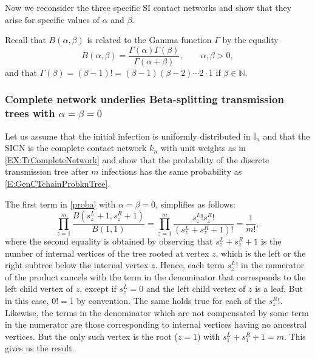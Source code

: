 \documentclass[review]{elsarticle}
\numberwithin{equation}{section}
\let\orgautoref\autoref
\renewcommand{\autoref}
        {\def\equationautorefname{Eq.}%
         \def\figureautorefname{Fig.}%
         \def\subfigureautorefname{Fig.}%
         \def\sectionautorefname{Sect.}%
         \def\subsectionautorefname{Sect.}%
         \def\subsubsectionautorefname{Sect.}%
         \def\Itemautorefname{item}%
         \def\tableautorefname{Table}%
         \def\propositionautorefname{Prop.}%
         \def\corollaryautorefname{Corollary}%
         \def\theoremautorefname{Theorem}%
         \def\remarkautorefname{Remark}%
         \def\lemmaautorefname{Lemma}%
         \def\proofofautorefname{Proof}%
         \def\exampleautorefname{Example}%
         \orgautoref}
\newcommand{\bI}{{\mathbb I}}
\newcommand{\bN}{{\mathbb N}}
\begin{document}
Now we reconsider the three specific SI contact networks and show that they arise for specific values of $\alpha$ and $\beta$.  

Recall that $B(\alpha,\beta)$ is related to the Gamma function $\Gamma$ by the equality
\begin{equation}
B(\alpha,\beta)=\frac{\Gamma(\alpha)\Gamma(\beta)}{\Gamma(\alpha+\beta)},\qquad \alpha,\beta>0,
\end{equation}
and that $\Gamma(\beta)=(\beta-1)!=(\beta-1)(\beta-2)\cdots 2\cdot 1$ if $\beta\in \bN$. 

\subsubsection{Complete network underlies Beta-splitting transmission trees with $\alpha=\beta=0$}
Let us assume that the initial infection is uniformly distributed in $\bI_n$ and that the SICN is the complete contact network $k_n$ with unit weights as in \autoref{EX:TrCompleteNetwork} and show that the probability of the discrete transmission tree after $m$ infections has the same probability as \autoref{E:GenCTchainProbknTree}.  

The first term in \autoref{proba} with $\alpha=\beta = 0$, simplifies as follows:
\begin{equation}\label{E:beta0}
\prod_{z=1}^{m} \frac{B(s_z^L+1,s_z^R+1)}{B(1,1)}= \prod_{z=1}^{m} \frac{s_z^L!s_z^R!}{(s_z^L+s_z^R+1)!} = \frac{1}{m!},
\end{equation}
where the second equality is obtained by observing that $s_z^L+s_z^R+1$ is the number of internal vertices of the tree rooted at vertex $z$, which is the left or the right subtree below the internal vertex $z$.  
Hence, each term $s_z^L!$ in the numerator of the product cancels with the term in the denominator that corresponds to the left child vertex of $z$, except if $s_z^L=0$ and the left child vertex of $z$ is a leaf.  
But in this case, $0!=1$ by convention.  
The same holds true for each of the $s_z^R!$.  
Likewise, the terms in the denominator which are not compensated by some term in the numerator are those corresponding to internal vertices having no ancestral vertices.  
But the only such vertex is the root ($z=1$) with $s_1^L+s_1^R+1=m$.  
This gives us the result.
\end{document}
